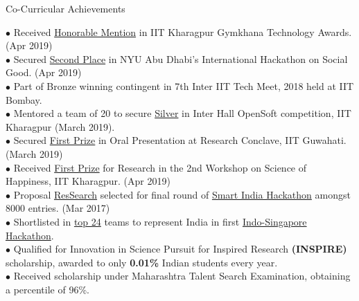 \documentclass{resume} %
\begin{document}

\begin{rSection}{Co-Curricular Achievements}

$\bullet$ Received \href{https://sites.nyuad.nyu.edu/hackathon/}{Honorable Mention} in IIT Kharagpur Gymkhana Technology Awards. (Apr 2019) \\
$\bullet$ Secured \href{https://sites.nyuad.nyu.edu/hackathon/}{Second Place} in NYU Abu Dhabi's International Hackathon on Social Good. (Apr 2019) \\
$\bullet$ Part of Bronze winning contingent in 7th Inter IIT Tech Meet, 2018 held at IIT Bombay. \\
$\bullet$ Mentored a team of 20 to secure \href{}{Silver} in Inter Hall OpenSoft competition, IIT Kharagpur (March 2019).\\
$\bullet$ Secured \href{https://drive.google.com/file/d/13SDYiXpSi7zXI_bZTb_tj8YukIONf9vn/view?usp=sharing}{First Prize} in Oral Presentation at Research Conclave, IIT Guwahati. (March 2019)\\
$\bullet$ Received \href{https://drive.google.com/file/d/1qDoD5THDmMyWmFPaEpmMYpaEBe0T35ay/view?usp=sharing}{First Prize} for  Research  in the 2nd Workshop on Science of Happiness, IIT Kharagpur. (Apr 2019) \\
$\bullet$ Proposal \href{https://docs.google.com/presentation/d/1ndJbIQCxFEf__I55yOOME-a_UGWDv1KMlukVE2lbDeA/}{ResSearch} selected for final round of \href{https://drive.google.com/open?id=0B5iU6cWw36rOamZLWHZENWdlY0k}{Smart India Hackathon} amongst 8000 entries. (Mar 2017) \\
$\bullet$ Shortlisted in \href{https://www.aicte-india.org/sites/default/files/Shortlisted and waitlisted Teams indo singapore hackathon 2018.pdf}{top 24} teams to represent India in first \href{http://www.ntu.edu.sg/events/events/Pages/Singapore-India-Hackathon-20181002-2080.aspx}{Indo-Singapore Hackathon}.\\
$\bullet$ Qualified for Innovation in Science Pursuit for Inspired Research {\bf \large (INSPIRE)} scholarship, awarded to only \textbf{0.01\%} Indian students every year. \\
$\bullet$ Received scholarship under Maharashtra Talent Search Examination, obtaining a percentile of 96\%.


\end{rSection}
\end{document}
